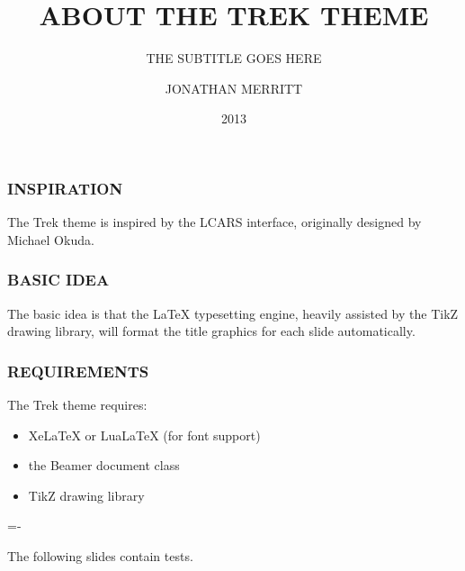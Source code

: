 \documentclass{beamer}
\begin{document}
\title{ABOUT THE TREK THEME}
\author{JONATHAN MERRITT}
\subtitle{THE SUBTITLE GOES HERE}
\date{2013}

\begin{frame}
  \titlepage
\end{frame}

\begin{frame}
  \frametitle{INSPIRATION}
  The Trek theme is inspired by the LCARS interface, originally designed by Michael Okuda.
\end{frame}

\begin{frame}
  \frametitle{BASIC IDEA}
  The basic idea is that the LaTeX typesetting engine, heavily assisted by the TikZ drawing library,
  will format the title graphics for each slide automatically.
\end{frame}

\begin{frame}
  \frametitle{REQUIREMENTS}
  The Trek theme requires:
  \begin{itemize}
    \item XeLaTeX or LuaLaTeX (for font support)
    \item the Beamer document class
    \item TikZ drawing library
  \end{itemize}
\end{frame}

\newdimen\sidebaradj\makeatletter\sidebaradj=-\the\trek@sidebar@width\makeatother
\begin{frame}[plain]
  \advance\textwidth\sidebaradj\hsize\textwidth
  \begin{center}
    The following slides contain tests.
  \end{center}
\end{frame}
\end{document}
